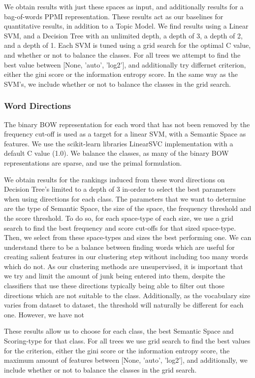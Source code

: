We obtain results with just these spaces as input, and additionally results for a bag-of-words PPMI representation. These results act as our baselines for quantitative results, in addition to a Topic Model. We find results using a Linear SVM, and a Decision Tree with an unlimited depth, a depth of 3, a depth of 2, and a depth of 1. Each SVM is tuned using a grid search for the optimal C value, and whether or not to balance the classes. For all trees we attempt to find the best value between [None, 'auto', 'log2'], and additionally try differnet criterion, either the gini score or the information entropy score. In the same way as the SVM's, we include whether or not to balance the classes in the grid search.

\subsubsection{Word Directions}
The binary BOW representation for each word that has not been removed by the frequency cut-off is used as a target for a linear SVM, with a Semantic Space as features. We use the scikit-learn libraries LinearSVC implementation with a default C value (1.0). We balance the classes, as many of the binary BOW representations are sparse, and use the primal formulation. %

We obtain results for the rankings induced from these word directions on Decision Tree's limited to a depth of 3 in-order to select the best parameters when using directions for each class. The parameters that we want to determine are the type of Semantic Space, the size of the space, the frequency threshold and the score threshold. To do so, for each space-type of each size, we use a grid search to find the best frequency and score cut-offs for that sized space-type. Then, we select from these space-types and sizes the best performing one. We can understand there to be a balance between finding words which are useful for creating salient features in our clustering step without including too many words which do not. As our clustering methods are unsupervised, it is important that we try and limit the amount of junk being entered into them, despite the classifiers that use these directions typically being able to filter out those directions which are not suitable to the class. Additionally, as the vocabulary size varies from dataset to dataset, the threshold will naturally be different for each one. However, we have not 

These results allow us to choose for each class, the best Semantic Space and Scoring-type for that class. For all trees we use grid search to find the best values for the criterion, either the gini score or the information entropy score, the maximum amount of features between [None, 'auto', 'log2'], and additionally, we include whether or not to balance the classes in the grid search.

